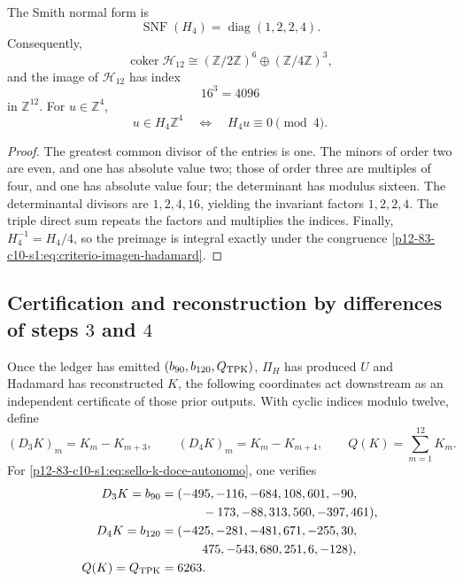\begin{theorem}
\label{p12-83-c10-s1:thm:smith-hadamard-autonomo}
The Smith normal form is
\begin{equation}
 \operatorname{SNF}(H_4)=\operatorname{diag}(1,2,2,4).
 \label{p12-83-c10-s1:eq:snf-hadamard-autonoma}
\end{equation}
Consequently,
\begin{equation}
 \operatorname{coker}\mathcal H_{12}
 \cong(\mathbb Z/2\mathbb Z)^6
 \oplus(\mathbb Z/4\mathbb Z)^3,
 \label{p12-83-c10-s1:eq:cociente-hadamard-doce}
\end{equation}
and the image of \(\mathcal H_{12}\) has index
\[
 16^3=4096
\]
in \(\mathbb Z^{12}\). For \(u\in\mathbb Z^4\),
\begin{equation}
 u\in H_4\mathbb Z^4
 \quad\Longleftrightarrow\quad
 H_4u\equiv0\pmod4.
 \label{p12-83-c10-s1:eq:criterio-imagen-hadamard}
\end{equation}
\end{theorem}

\begin{proof}
The greatest common divisor of the entries is one. The minors of order two are
even, and one has absolute value two; those of order three are multiples of
four, and one has absolute value four; the determinant has modulus
sixteen. The determinantal divisors are \(1,2,4,16\), yielding
the invariant factors \(1,2,2,4\). The triple direct sum repeats the
factors and multiplies the indices. Finally,
\(H_4^{-1}=H_4/4\), so the preimage is integral exactly under the
congruence \eqref{p12-83-c10-s1:eq:criterio-imagen-hadamard}.
\end{proof}

\subsection{Certification and reconstruction by differences of steps \(3\) and \(4\)}

Once the ledger has emitted \((b_{90},b_{120},Q_{\rm TPK})\),
\(\Pi_H\) has produced \(U\) and Hadamard has reconstructed \(K\), the
following coordinates act downstream as an independent certificate of
those prior outputs. With cyclic indices modulo twelve, define
\begin{equation}
 (D_3K)_m=K_m-K_{m+3},
 \qquad
 (D_4K)_m=K_m-K_{m+4},
 \qquad
 Q(K)=\sum_{m=1}^{12}K_m.
 \label{p12-83-c10-s1:eq:extractor-diferencias-k}
\end{equation}
For \eqref{p12-83-c10-s1:eq:sello-k-doce-autonomo}, one verifies
\begin{align*}
 D_3K=b_{90}={}&(-495,-116,-684,108,601,-90,\\
         &\qquad-173,-88,313,560,-397,461),\\
 D_4K=b_{120}={}&(-425,-281,-481,671,-255,30,\\
         &\qquad475,-543,680,251,6,-128),\\
 Q(K)=Q_{\rm TPK}={}&6263.
\end{align*}

